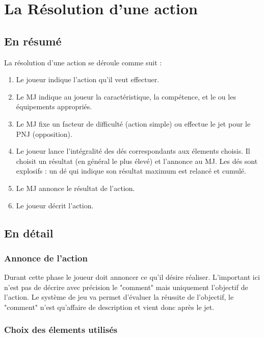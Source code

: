 \chapter{La Résolution d'une action}

\begin{multicols}{2}

\section{En résumé}

La résolution d'une action se déroule comme suit : 

\begin{enumerate}
\item Le joueur indique l'action qu'il veut effectuer.
\item Le MJ indique au joueur la caractéristique, la compétence, et le ou les équipements appropriés.
\item Le MJ fixe un facteur de difficulté (action simple) ou effectue le jet pour le PNJ (opposition).
\item Le joueur lance l'intégralité des dés correspondants aux élements choisis. Il choisit un résultat (en général le plus élevé) et l'annonce au MJ. Les dés sont explosifs : un dé qui indique son résultat maximum est relancé et cumulé.
\item Le MJ annonce le résultat de l'action.
\item Le joueur décrit l'action.
\end{enumerate}

\section{En détail}

\subsection{Annonce de l'action}

Durant cette phase le joueur doit annoncer ce qu'il désire réaliser. L'important ici n'est pas de décrire avec précision le "comment" mais uniquement l'objectif de l'action. Le système de jeu va permet d'évaluer la réussite de l'objectif, le "comment" n'est qu'affaire de description et vient donc après le jet.

\subsection{Choix des élements utilisés}


\end{multicols}
